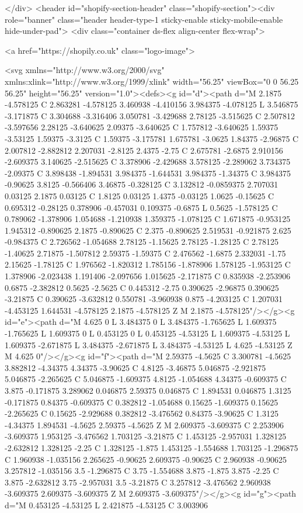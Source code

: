 {{{{{</div>
  <header id="shopify-section-header" class="shopify-section"><div role="banner" class="header header-type-1 sticky-enable sticky-mobile-enable hide-under-pad">
  <div class="container ds-flex align-center flex-wrap">
    

<a href="https://shopily.co.uk" class="logo-image">

<svg xmlns="http://www.w3.org/2000/svg" xmlns:xlink="http://www.w3.org/1999/xlink" width="56.25" viewBox="0 0 56.25 56.25" height="56.25" version="1.0"><defs><g id="d"><path d="M 2.1875 -4.578125 C 2.863281 -4.578125 3.460938 -4.410156 3.984375 -4.078125 L 3.546875 -3.171875 C 3.304688 -3.316406 3.050781 -3.429688 2.78125 -3.515625 C 2.507812 -3.597656 2.28125 -3.640625 2.09375 -3.640625 C 1.757812 -3.640625 1.59375 -3.53125 1.59375 -3.3125 C 1.59375 -3.175781 1.675781 -3.0625 1.84375 -2.96875 C 2.007812 -2.882812 2.207031 -2.8125 2.4375 -2.75 C 2.675781 -2.6875 2.910156 -2.609375 3.140625 -2.515625 C 3.378906 -2.429688 3.578125 -2.289062 3.734375 -2.09375 C 3.898438 -1.894531 3.984375 -1.644531 3.984375 -1.34375 C 3.984375 -0.90625 3.8125 -0.566406 3.46875 -0.328125 C 3.132812 -0.0859375 2.707031 0.03125 2.1875 0.03125 C 1.8125 0.03125 1.4375 -0.03125 1.0625 -0.15625 C 0.695312 -0.28125 0.378906 -0.457031 0.109375 -0.6875 L 0.5625 -1.578125 C 0.789062 -1.378906 1.054688 -1.210938 1.359375 -1.078125 C 1.671875 -0.953125 1.945312 -0.890625 2.1875 -0.890625 C 2.375 -0.890625 2.519531 -0.921875 2.625 -0.984375 C 2.726562 -1.054688 2.78125 -1.15625 2.78125 -1.28125 C 2.78125 -1.40625 2.71875 -1.507812 2.59375 -1.59375 C 2.476562 -1.6875 2.332031 -1.75 2.15625 -1.78125 C 1.976562 -1.820312 1.785156 -1.878906 1.578125 -1.953125 C 1.378906 -2.023438 1.191406 -2.097656 1.015625 -2.171875 C 0.835938 -2.253906 0.6875 -2.382812 0.5625 -2.5625 C 0.445312 -2.75 0.390625 -2.96875 0.390625 -3.21875 C 0.390625 -3.632812 0.550781 -3.960938 0.875 -4.203125 C 1.207031 -4.453125 1.644531 -4.578125 2.1875 -4.578125 Z M 2.1875 -4.578125"/></g><g id="e"><path d="M 4.625 0 L 3.484375 0 L 3.484375 -1.765625 L 1.609375 -1.765625 L 1.609375 0 L 0.453125 0 L 0.453125 -4.53125 L 1.609375 -4.53125 L 1.609375 -2.671875 L 3.484375 -2.671875 L 3.484375 -4.53125 L 4.625 -4.53125 Z M 4.625 0"/></g><g id="f"><path d="M 2.59375 -4.5625 C 3.300781 -4.5625 3.882812 -4.34375 4.34375 -3.90625 C 4.8125 -3.46875 5.046875 -2.921875 5.046875 -2.265625 C 5.046875 -1.609375 4.8125 -1.054688 4.34375 -0.609375 C 3.875 -0.171875 3.289062 0.046875 2.59375 0.046875 C 1.894531 0.046875 1.3125 -0.171875 0.84375 -0.609375 C 0.382812 -1.054688 0.15625 -1.609375 0.15625 -2.265625 C 0.15625 -2.929688 0.382812 -3.476562 0.84375 -3.90625 C 1.3125 -4.34375 1.894531 -4.5625 2.59375 -4.5625 Z M 2.609375 -3.609375 C 2.253906 -3.609375 1.953125 -3.476562 1.703125 -3.21875 C 1.453125 -2.957031 1.328125 -2.632812 1.328125 -2.25 C 1.328125 -1.875 1.453125 -1.554688 1.703125 -1.296875 C 1.960938 -1.035156 2.265625 -0.90625 2.609375 -0.90625 C 2.960938 -0.90625 3.257812 -1.035156 3.5 -1.296875 C 3.75 -1.554688 3.875 -1.875 3.875 -2.25 C 3.875 -2.632812 3.75 -2.957031 3.5 -3.21875 C 3.257812 -3.476562 2.960938 -3.609375 2.609375 -3.609375 Z M 2.609375 -3.609375"/></g><g id="g"><path d="M 0.453125 -4.53125 L 2.421875 -4.53125 C 3.003906 }}}}}

